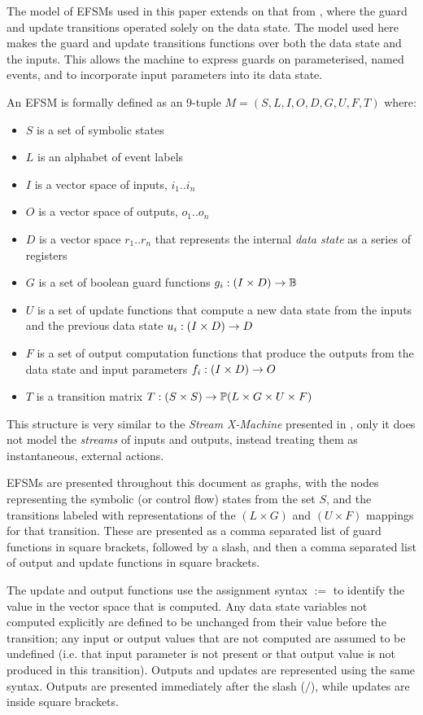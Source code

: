 The model of EFSMs used in this paper extends on that from \cite{EFSMs}, where the guard and update transitions operated solely on the data state. The model used here makes the guard and update transitions functions over both the data state and the inputs. This allows the machine to express guards on parameterised, named events, and to incorporate input parameters into its data state.
  
An EFSM is formally defined as an 9-tuple $M = (S,L,I,O,D,G,U,F,T)$ where:

\begin{itemize}
\item{$S$ is a set of symbolic states}
\item{$L$ is an alphabet of event labels}
\item{$I$ is a vector space of inputs, $i_{1} .. i_{n}$}
\item{$O$ is a vector space of outputs, $o_{1} .. o_{n}$}
\item{$D$ is a vector space $r_{1} .. r_{n}$ that represents the internal \emph{data state} as a series of registers}
\item{$G$ is a set of boolean guard functions $g_{i} : (I \times D) \rightarrow {\mathbb B}$}
\item{$U$ is a set of update functions that compute a new data state from the inputs and the previous data state $u_{i} : (I \times D) \rightarrow D$}
\item{$F$ is a set of output computation functions that produce the outputs from the data state and input parameters $f_{i} : (I \times D) \rightarrow O$}
\item{$T$ is a transition matrix $T : (S \times S) \rightarrow \mathbb P (L \times G \times U \times F)$}
\end{itemize}

This structure is very similar to the \emph{Stream X-Machine} presented in \cite{StreamXMachines}, only it does not model the \emph{streams} of inputs and outputs, instead treating them as instantaneous, external actions.

EFSMs are presented throughout this document as graphs, with the nodes representing the symbolic (or control flow) states from the set $S$, and the transitions labeled with representations of the $(L \times G)$ and $(U \times F)$ mappings for that transition. These are presented as a comma separated list of guard functions in square brackets, followed by a slash, and then a comma separated list of output and update functions in square brackets.

The update and output functions use the assignment syntax $:=$ to identify the value in the vector space that is computed. Any data state variables not computed explicitly are defined to be unchanged from their value before the transition; any input or output values that are not computed are assumed to be undefined (i.e. that input parameter is not present or that output value is not produced in this transition). Outputs and updates are represented using the same syntax. Outputs are presented immediately after the slash ($/$), while updates are inside square brackets.


